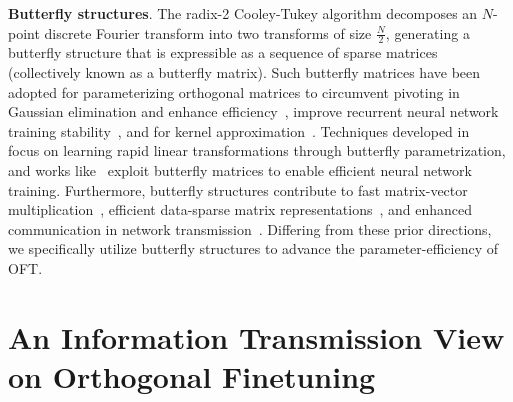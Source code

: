 \textbf{Butterfly structures}. The radix-2 Cooley-Tukey algorithm decomposes an $N$-point discrete Fourier transform into two transforms of size $\frac{N}{2}$, generating a butterfly structure that is expressible as a sequence of sparse matrices (collectively known as a butterfly matrix). Such butterfly matrices have been adopted for parameterizing orthogonal matrices to circumvent pivoting in Gaussian elimination and enhance efficiency~\cite{parker1995random}, improve recurrent neural network training stability~\cite{jing2017tunable}, and for kernel approximation~\cite{munkhoeva2018quadrature}. Techniques developed in~\cite{dao2019learning,dao2019kaleidoscope} focus on learning rapid linear transformations through butterfly parametrization, and works like~\cite{chen2022pixelated,dao2022monarch} exploit butterfly matrices to enable efficient neural network training. Furthermore, butterfly structures contribute to fast matrix-vector multiplication~\cite{michielssen1996multilevel,o2010algorithm}, efficient data-sparse matrix representations~\cite{li2015butterfly}, and enhanced communication in network transmission~\cite{klasing1994broadcasting,li2003linear,rajasingh2016transmission}. Differing from these prior directions, we specifically utilize butterfly structures to advance the parameter-efficiency of OFT.

\section{An Information Transmission View on Orthogonal Finetuning}

